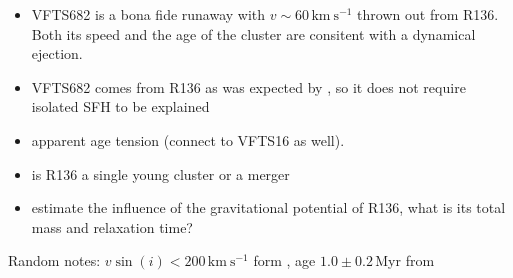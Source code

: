 \documentclass{aa}
\begin{document}
\begin{itemize}
\item VFTS682 is a bona fide runaway with $v\sim60\,\mathrm{km\
    s^{-1}}$ thrown out from R136. Both its speed and the age of the
  cluster are consitent with a dynamical ejection.
  \item VFTS682 comes from R136 as was expected by
  \cite{bestenlehner:11, fujii:11, banerjee:12}, so it does not
  require isolated SFH to be explained
\item apparent age tension (connect to VFTS16 as well).
\item is R136 a single young cluster or a merger
\item estimate the influence of the gravitational potential of R136,
  what is its total mass and relaxation time?
\end{itemize}

Random notes: $v\sin(i)<200\,\mathrm{km\ s^{-1}}$ form \cite{schneider:18}, age $1.0\pm 0.2$\,Myr
from \cite{schneider:18}




\end{document}

